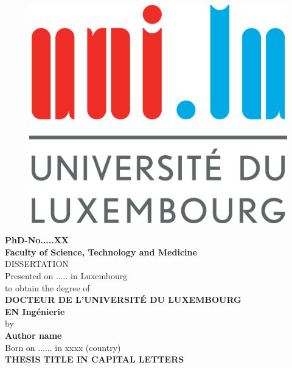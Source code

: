 \documentclass[11pt,a4paper]{report}
\begin{document}

\thispagestyle{empty}
\begin{figure}
\includegraphics[width=0.3\columnwidth]{./Figures/logo_uni.eps}
\centering
\end{figure}

\begin {center}
\textbf{\footnotesize{PhD-No.....XX}}\\
\vspace{0.4cm}
\textbf{\footnotesize{Faculty of Science, Technology and Medicine}}\\
\vspace{2.2cm}
\large{DISSERTATION}\\
\vspace{0.3cm}
Presented on ..... in Luxembourg\\
\vspace{0.3cm}
to obtain the degree of\\
\vspace{0.3cm}
\textbf{\Large{DOCTEUR DE L'UNIVERSITÉ DU LUXEMBOURG}}\\
\vspace{0.5cm}
\textbf{\Large{EN Ingénierie}}\\
\vspace{1.6cm}
by\\
\vspace{0.3cm}
\textbf{Author name}\\
\vspace{0.3cm}
Born on ...... in xxxx (country)\\
\vfill
\textbf{\Large{THESIS TITLE IN CAPITAL LETTERS}}


\end {center}

\newpage
\thispagestyle{empty}
\end{document}
